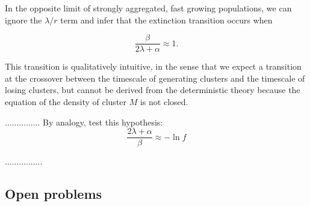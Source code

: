 \documentclass[12pt]{article}
\def\be{\begin{equation}}
\def\ee{\end{equation}}
\begin{document}
In the opposite limit of strongly aggregated, fast growing populations, we can ignore the $\lambda/r$ term and infer that the extinction transition occurs when  

\be
	\frac{\beta}{2\lambda + \alpha} \approx 1.
\ee

\noindent This transition is qualitatively intuitive, in the sense that we expect a transition at the crossover between the timescale of generating clusters and the timescale of losing clusters, but cannot be derived from the deterministic theory because the equation of the density of cluster $M$ is not closed.

...............
By analogy, test this hypothesis:
\be
\frac{2\lambda + \alpha}{\beta} \approx -\ln f
\ee


................

\subsection*{Open problems}
\end{document}
